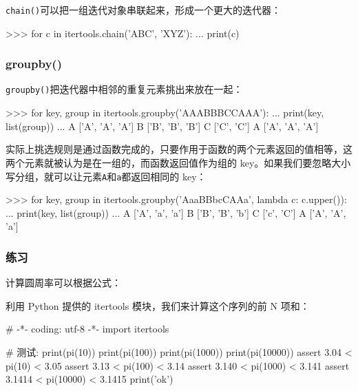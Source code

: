 \texttt{chain()}可以把一组迭代对象串联起来，形成一个更大的迭代器：

\begin{pythoncode}
>>> for c in itertools.chain('ABC', 'XYZ'):
...     print(c)
\end{pythoncode}

\hypertarget{groupby}{%
\subsubsection{groupby()}\label{groupby}}

\texttt{groupby()}把迭代器中相邻的重复元素挑出来放在一起：

\begin{pythoncode}
>>> for key, group in itertools.groupby('AAABBBCCAAA'):
...     print(key, list(group))
...
A ['A', 'A', 'A']
B ['B', 'B', 'B']
C ['C', 'C']
A ['A', 'A', 'A']
\end{pythoncode}

实际上挑选规则是通过函数完成的，只要作用于函数的两个元素返回的值相等，这两个元素就被认为是在一组的，而函数返回值作为组的
key。如果我们要忽略大小写分组，就可以让元素\texttt{\textquotesingle{}A\textquotesingle{}}和\texttt{\textquotesingle{}a\textquotesingle{}}都返回相同的
key：

\begin{pythoncode}
>>> for key, group in itertools.groupby('AaaBBbcCAAa', lambda c: c.upper()):
...     print(key, list(group))
...
A ['A', 'a', 'a']
B ['B', 'B', 'b']
C ['c', 'C']
A ['A', 'A', 'a']
\end{pythoncode}

\hypertarget{ux7ec3ux4e60}{%
\subsubsection{练习}\label{ux7ec3ux4e60}}

计算圆周率可以根据公式：

利用 Python 提供的 itertools 模块，我们来计算这个序列的前 N 项和：

\begin{pythoncode}
# -*- coding: utf-8 -*-
import itertools
\end{pythoncode}

\begin{pythoncode}
# 测试:
print(pi(10))
print(pi(100))
print(pi(1000))
print(pi(10000))
assert 3.04 < pi(10) < 3.05
assert 3.13 < pi(100) < 3.14
assert 3.140 < pi(1000) < 3.141
assert 3.1414 < pi(10000) < 3.1415
print('ok')
\end{pythoncode}

